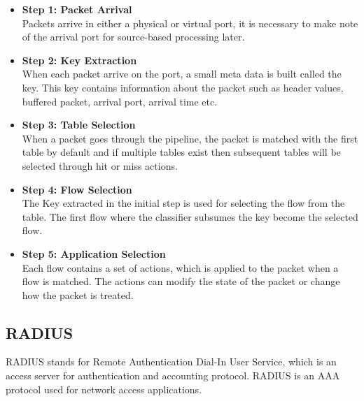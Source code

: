 \begin{itemize}
	\item \textbf{Step 1: Packet Arrival}
	\\ Packets arrive in either a physical or virtual port, it is necessary to make note of the arrival port for source-based processing later.
	\item \textbf{Step 2: Key Extraction}
	\\ When each packet arrive on the port, a small meta data is built called the key. This key contains information about the packet such as header values, buffered packet, arrival port, arrival time etc. 

	\item \textbf{Step 3: Table Selection}
	\\ When a packet goes through the pipeline, the packet is matched with the first table by default and if multiple tables exist then subsequent tables will be selected through hit or miss actions.
	\item \textbf{Step 4: Flow Selection}
	\\ The Key extracted in the initial step is used for selecting the flow from the table. The first flow where the classifier subsumes the key become the selected flow.
	\item \textbf{Step 5: Application Selection}
	\\ Each flow contains a set of actions, which is applied to the packet when a flow is matched. The actions can modify the state of the packet or change how the packet is treated. 
	
\end{itemize}

\subsection{RADIUS \cite{RADIUS_RFC2865}} \label{RADIUS}
RADIUS stands for Remote Authentication Dial-In User Service, which is an access server for authentication and accounting protocol. RADIUS is an AAA protocol used for network access applications.
